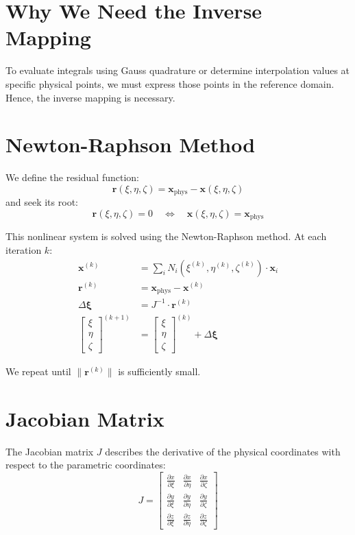\documentclass[letterpaper, 11pt]{article}
\begin{document}
		\section*{Why We Need the Inverse Mapping}
		To evaluate integrals using Gauss quadrature or determine interpolation values at specific physical points, we must express those points in the reference domain. Hence, the inverse mapping is necessary.
		
		\section*{Newton-Raphson Method}
		We define the residual function:
		\[
		\mathbf{r}(\xi, \eta, \zeta) = \mathbf{x}_{\text{phys}} - \mathbf{x}(\xi, \eta, \zeta)
		\]
		and seek its root:
		\[
		\mathbf{r}(\xi, \eta, \zeta) = 0 \quad \Leftrightarrow \quad \mathbf{x}(\xi, \eta, \zeta) = \mathbf{x}_{\text{phys}}
		\]
		
		This nonlinear system is solved using the Newton-Raphson method. At each iteration \(k\):
		\begin{align*}
			\mathbf{x}^{(k)} &= \sum_i N_i(\xi^{(k)}, \eta^{(k)}, \zeta^{(k)}) \cdot \mathbf{x}_i \\
			\mathbf{r}^{(k)} &= \mathbf{x}_{\text{phys}} - \mathbf{x}^{(k)} \\
			\Delta \boldsymbol{\xi} &= J^{-1} \cdot \mathbf{r}^{(k)} \\
			\begin{bmatrix} \xi \\ \eta \\ \zeta \end{bmatrix}^{(k+1)} &= \begin{bmatrix} \xi \\ \eta \\ \zeta \end{bmatrix}^{(k)} + \Delta \boldsymbol{\xi}
		\end{align*}
		
		We repeat until \(\|\mathbf{r}^{(k)}\|\) is sufficiently small.
		
		\section*{Jacobian Matrix}
		The Jacobian matrix \(J\) describes the derivative of the physical coordinates with respect to the parametric coordinates:
		\[
		J = 
		\begin{bmatrix}
			\frac{\partial x}{\partial \xi} & \frac{\partial x}{\partial \eta} & \frac{\partial x}{\partial \zeta} \\
			\frac{\partial y}{\partial \xi} & \frac{\partial y}{\partial \eta} & \frac{\partial y}{\partial \zeta} \\
			\frac{\partial z}{\partial \xi} & \frac{\partial z}{\partial \eta} & \frac{\partial z}{\partial \zeta}
		\end{bmatrix}
		\]
		
\end{document}
